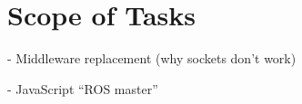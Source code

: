 \chapter{Scope of Tasks}\label{cha:scope}

- Middleware replacement (why sockets don't work)

- JavaScript ``ROS master''
